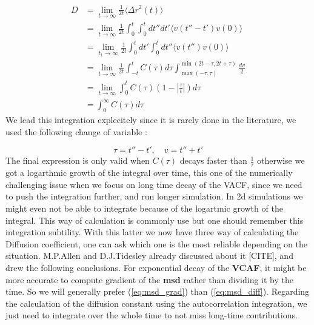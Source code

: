 \documentclass[ansiapaper]{report}
\begin{document}
\begin{multicols}{3}
\begin{align*}
    D &= \lim_{t \rightarrow \infty} \frac{1}{2t} \langle \Delta r^2(t) \rangle \\
    &= \lim_{t \rightarrow \infty} \frac{1}{2t} \int_{0}^{t} \int_{0}^{t} dt'' dt' \langle v(t'' - t')v(0) \rangle \\
    &= \lim_{t_1 \rightarrow \infty} \frac{1}{2t} \int_{0}^{t} dt' \int_{0}^{t} dt'' \langle v(t'')v(0) \rangle \\
    &= \lim_{t \rightarrow \infty} \frac{1}{2t} \int_{-t}^{t} C(\tau) d \tau \int_{\max(- \tau,\tau)}^{\min(2t - \tau, 2t + \tau)} \frac{dv}{2}\\
    &= \lim_{t \rightarrow \infty} \int_{0}^{t} C(\tau) (1 - |\frac{\tau}{t}|)d \tau \\
    &= \int_{0}^{\infty} C(\tau) d \tau
\end{align*}
We lead this integration explecitely since it is rarely done in the literature, we used the following change of variable : 

 $$ \tau = t'' - t' , \quad v = t'' + t'$$
The final expression is only valid when $C(\tau)$ decays faster than $\frac{1}{\tau}$ otherwise we got a logarthmic growth of the integral over time, this one of the numerically challenging issue when we focus on long time decay of the VACF, since we need to push the integration further, and run longer simulation. In 2d simulations we might even not be able to integrate because of the logartmic growth of the integral. This way of calculation is commonly use but one should remember this integration subtility. With this latter  we now have three way of calculating the Diffusion coefficient, one can ask which one is the most reliable depending on the situation. M.P.Allen and D.J.Tidesley already discussed about it [CITE], and drew the following conclusions. For exponential decay of the \textbf{VCAF}, it might be more accurate to compute gradient of the \textbf{msd} rather than dividing it by the time. So we will generally prefer (\ref{eq:msd_grad}) than (\ref{eq:msd_diff}). Regarding the calculation of the diffusion constant using the autocorrelation integration, we just need to integrate over the whole time to not miss long-time contributions. 


\end{multicols}
\end{document}
